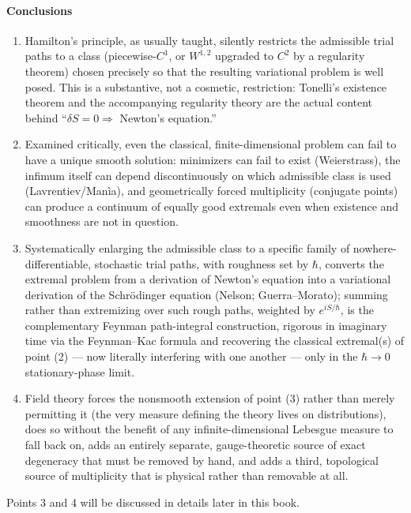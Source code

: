 \paragraph{Conclusions}
\begin{enumerate}
\item Hamilton's principle, as usually taught, silently restricts the
    admissible trial paths to a class (piecewise-$C^1$, or $W^{1,2}$ upgraded
        to $C^2$ by a regularity theorem) chosen precisely so that the
        resulting variational problem is well posed. This is a substantive, not
        a cosmetic, restriction: Tonelli's existence theorem and the
        accompanying regularity theory are the actual content behind 
        ``$\delta S=0 \Rightarrow$ Newton's equation.''
\item Examined critically, even the classical, finite-dimensional problem can
    fail to have a unique smooth solution: minimizers can fail to exist
        (Weierstrass), the infimum itself can depend discontinuously on which
        admissible class is used (Lavrentiev/Man\`ia), and geometrically forced
        multiplicity (conjugate points) can produce a continuum of equally good
        extremals even when existence and smoothness are not in question.
\item Systematically enlarging the admissible class to a specific family of
    nowhere-differentiable, stochastic trial paths, with roughness set by
        $\hbar$, converts the extremal problem from a derivation of Newton's
        equation into a variational derivation of the Schr\"odinger equation
        (Nelson; Guerra--Morato); summing rather than extremizing over such
        rough paths, weighted by $e^{iS/\hbar}$, is the complementary Feynman
        path-integral construction, rigorous in imaginary time via the
        Feynman--Kac formula and recovering the classical extremal(s) of point
        (2) --- now literally interfering with one another --- only in the
        $\hbar\to0$ stationary-phase limit.
\item Field theory forces the nonsmooth extension of point (3) rather than
    merely permitting it (the very measure defining the theory lives on
        distributions), does so without the benefit of any infinite-dimensional
        Lebesgue measure to fall back on, adds an entirely separate,
        gauge-theoretic source of exact degeneracy that must be removed by
        hand, and adds a third, topological source of multiplicity that is
        physical rather than removable at all.
\end{enumerate}
Points 3 and 4 will be discussed in details later in this book.
